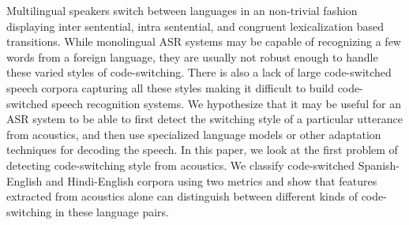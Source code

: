 Multilingual speakers switch between languages in an non-trivial fashion displaying inter sentential, intra sentential, and congruent lexicalization based transitions. While monolingual ASR systems may be capable of recognizing a few words from a foreign language, they are usually not robust enough to handle these varied styles of code-switching. There is also a lack of large code-switched speech corpora capturing all these styles making it difficult to build code-switched speech recognition systems. We hypothesize that it may be useful for an ASR system to be able to first detect the switching style of a particular utterance from acoustics, and then use specialized language models or other adaptation techniques for decoding the speech. In this paper, we look at the first problem of detecting code-switching style from acoustics. We classify code-switched Spanish-English and Hindi-English corpora using two metrics and show that features extracted from acoustics alone can distinguish between different kinds of code-switching in these language pairs.
